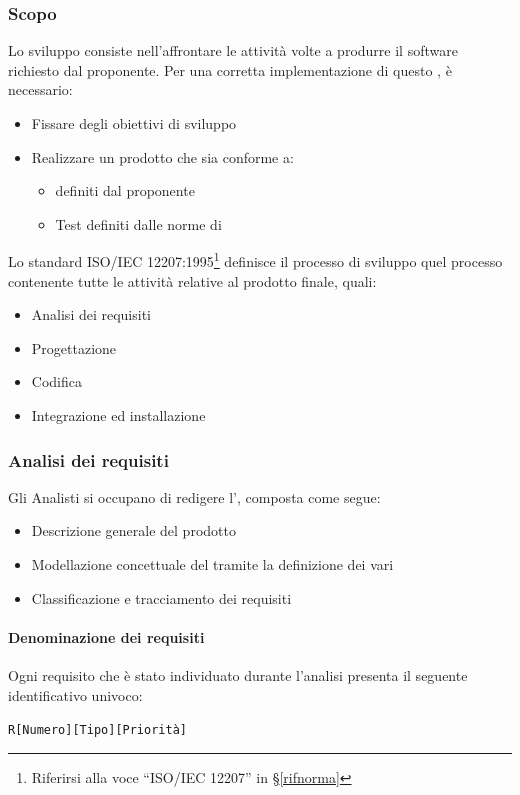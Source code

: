 		\subsubsection{Scopo}\label{PP:Sviluppo:Scopo}
		Lo sviluppo consiste nell'affrontare le attività volte a produrre il software richiesto dal proponente.
		Per una corretta implementazione di questo , è necessario:
		\begin{itemize}
			\item Fissare degli obiettivi di sviluppo
			\item Realizzare un prodotto che sia conforme a:
			\begin{itemize}
				\item {} definiti dal proponente
				\item Test definiti dalle norme di 
			\end{itemize}
		\end{itemize}
		Lo standard ISO/IEC 12207:1995\footnote{Riferirsi alla voce ``ISO/IEC 12207'' in \S\ref{rifnorma}} definisce il processo di
		sviluppo quel processo contenente tutte le attività relative al prodotto finale, quali:
		\begin{itemize} %
			\item Analisi dei requisiti
			\item Progettazione
			\item Codifica
			\item Integrazione ed installazione
		\end{itemize}


        \subsubsection{Analisi dei requisiti}\label{PP:Sviluppo:AdR}
		Gli Analisti si occupano di redigere l'\Doc{\AdRv}, composta come segue:
		\begin{itemize}
			\item Descrizione generale del prodotto
			\item Modellazione concettuale del  tramite la definizione dei vari 
			\item Classificazione e tracciamento dei requisiti
		\end{itemize}

		\paragraph{Denominazione dei requisiti}\label{PP:Sviluppo:AdR:DenominazioneRequisiti}
		Ogni requisito che è stato individuato durante l'analisi presenta il seguente identificativo univoco:
		\begin{center}
			\texttt{R[Numero][Tipo][Priorità]}
		\end{center}

